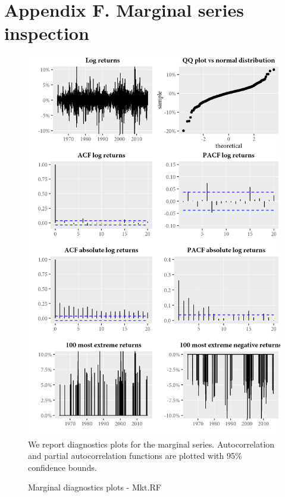 \section{Appendix F. Marginal series inspection}
\label{App:AppendixF}
\begin{figure}[H]
  \caption{Marginal diagnostics plots - Mkt.RF}
  \label{diag:marginaldiagMkt.RF}
  \toprule
  \centering
  \begin{minipage}{\textwidth}
  \includegraphics[scale=1]{graphics/marginal/MarginalStats.Mkt.RF.Estim.png}  
  \bottomrule
  \vspace{3mm}
  \footnotesize
  We report diagnostics plots for the marginal series. Autocorrelation and partial autocorrelation functions are plotted with 95\% confidence bounds. 
  \end{minipage}
\end{figure}
